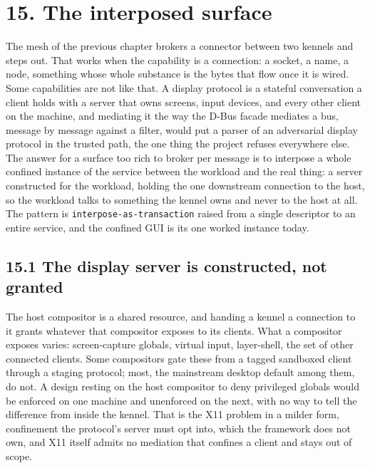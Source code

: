 \hypertarget{the-interposed-surface}{%
\chapter{15. The interposed surface}\label{the-interposed-surface}}

The mesh of the previous chapter brokers a connector between two kennels
and steps out. That works when the capability is a connection: a socket,
a name, a node, something whose whole substance is the bytes that flow
once it is wired. Some capabilities are not like that. A display
protocol is a stateful conversation a client holds with a server that
owns screens, input devices, and every other client on the machine, and
mediating it the way the D-Bus facade mediates a bus, message by message
against a filter, would put a parser of an adversarial display protocol
in the trusted path, the one thing the project refuses everywhere else.
The answer for a surface too rich to broker per message is to interpose
a whole confined instance of the service between the workload and the
real thing: a server constructed for the workload, holding the one
downstream connection to the host, so the workload talks to something
the kennel owns and never to the host at all. The pattern is
\texttt{interpose-as-transaction} raised from a single descriptor to an
entire service, and the confined GUI is its one worked instance today.

\hypertarget{the-display-server-is-constructed-not-granted}{%
\section{15.1 The display server is constructed, not
granted}\label{the-display-server-is-constructed-not-granted}}

The host compositor is a shared resource, and handing a kennel a
connection to it grants whatever that compositor exposes to its clients.
What a compositor exposes varies: screen-capture globals, virtual input,
layer-shell, the set of other connected clients. Some compositors gate
these from a tagged sandboxed client through a staging protocol; most,
the mainstream desktop default among them, do not. A design resting on
the host compositor to deny privileged globals would be enforced on one
machine and unenforced on the next, with no way to tell the difference
from inside the kennel. That is the X11 problem in a milder form,
confinement the protocol's server must opt into, which the framework
does not own, and X11 itself admits no mediation that confines a client
and stays out of scope.

